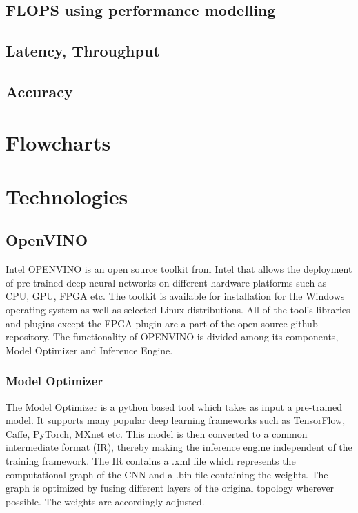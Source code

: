 \documentclass[titlepage]{report}
\begin{document}
\section{FLOPS using performance modelling}
\lipsum[3]

\section{Latency, Throughput}
\lipsum[3]

\section{Accuracy}
\lipsum[3]




\chapter{Flowcharts}
\lipsum[3]



\chapter{Technologies}

\section{OpenVINO}
Intel OPENVINO is an open source toolkit from Intel that allows the deployment of pre-trained deep neural networks on different hardware platforms such as CPU, GPU, FPGA etc. The toolkit is available for installation for the Windows operating system as well as selected Linux distributions. All of the tool's libraries and plugins except the FPGA plugin are a part of the open source github repository.
The functionality of OPENVINO is divided among its components, Model Optimizer and Inference Engine.

\subsection{Model Optimizer}
The Model Optimizer is a python based tool which takes as input a pre-trained model. It supports many popular deep learning frameworks such as TensorFlow, Caffe, PyTorch, MXnet etc. This model is then converted to a common intermediate format (IR), thereby making the inference engine independent of the training framework. The IR contains a .xml file which represents the computational graph of the CNN and a .bin file containing the weights. The graph is optimized by fusing different layers of the original topology wherever possible. The weights are accordingly adjusted. 
 
\end{document}
